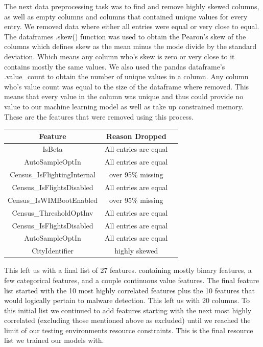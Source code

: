 \documentclass[sigconf]{acmart}
\begin{document}
The next data preprocessing task was to find and remove highly skewed columns, as well as empty columns and columns that contained unique values for every entry. We removed data where either all entries were equal or very close to equal. The dataframes .skew() function was used to obtain the Pearon's skew of the columns which defines skew as the mean minus the mode divide by the standard deviation. Which means any column who's skew is zero or very close to it contains mostly the same values. We also used the pandas dataframe's .value\_count to obtain the number of unique values in a column. Any column who's value count was equal to the size of the dataframe where removed. This means that every value in the column was unique and thus could provide no value to our machine learning model as well as take up  constrained memory. These are the features that were removed using this process.

\begin{center}
\begin{tabular}{ |c|c|c| } 
 \hline
 Feature & Reason Dropped \\
 \hline\hline
IsBeta & All entries are equal \\
AutoSampleOptIn & All entries are equal \\
Census\_IsFlightingInternal & over 95\% missing \\
Census\_IsFlightsDisabled & All entries are equal \\
Census\_IsWIMBootEnabled & over 95\% missing \\
Census\_ThresholdOptInv & All entries are equal \\
Census\_IsFlightsDisabled & All entries are equal \\
AutoSampleOptIn & All entries are equal \\
CityIdentifier & highly skewed \\ 
 \hline
\end{tabular}
\end{center}
\vspace{3mm}

This left us with a final list of 27 features. containing mostly binary features, a few categorical features, and a couple continuous value features. The final feature list started with the 10 most highly correlated features plus the 10 features that would logically pertain to malware detection. This left us with 20 columns. To this initial list we continued to add features starting with the next most highly correlated (excluding those mentioned above as excluded) until we reached the limit of our testing environments resource constraints. This is the final resource list we trained our models with. 
\end{document}
